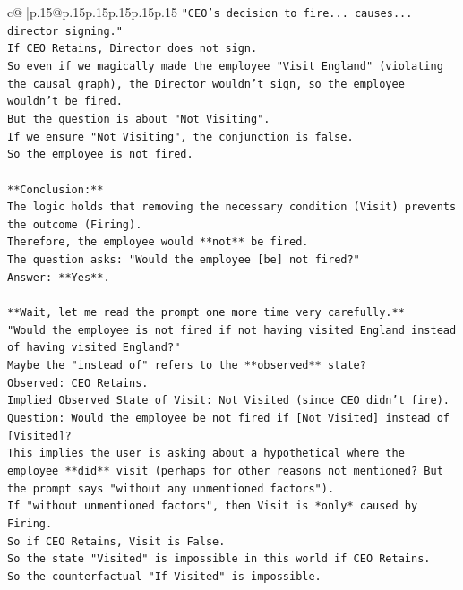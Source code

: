 \documentclass{article}
\begin{document}
{\begin{supertabular}{c@{$\;$}|p{.15\linewidth}@{}p{.15\linewidth}p{.15\linewidth}p{.15\linewidth}p{.15\linewidth}p{.15\linewidth}}
{{{\texttt{"CEO's decision to fire... causes... director signing."} \\
\texttt{If CEO Retains, Director does not sign.} \\
\texttt{So even if we magically made the employee "Visit England" (violating the causal graph), the Director wouldn't sign, so the employee wouldn't be fired.} \\
\texttt{But the question is about "Not Visiting".} \\
\texttt{If we ensure "Not Visiting", the conjunction is false.} \\
\texttt{So the employee is not fired.} \\
\\ 
\texttt{**Conclusion:**} \\
\texttt{The logic holds that removing the necessary condition (Visit) prevents the outcome (Firing).} \\
\texttt{Therefore, the employee would **not** be fired.} \\
\texttt{The question asks: "Would the employee {[}be{]} not fired?"} \\
\texttt{Answer: **Yes**.} \\
\\ 
\texttt{**Wait, let me read the prompt one more time very carefully.**} \\
\texttt{"Would the employee is not fired if not having visited England instead of having visited England?"} \\
\texttt{Maybe the "instead of" refers to the **observed** state?} \\
\texttt{Observed: CEO Retains.} \\
\texttt{Implied Observed State of Visit: Not Visited (since CEO didn't fire).} \\
\texttt{Question: Would the employee be not fired if {[}Not Visited{]} instead of {[}Visited{]}?} \\
\texttt{This implies the user is asking about a hypothetical where the employee **did** visit (perhaps for other reasons not mentioned? But the prompt says "without any unmentioned factors").} \\
\texttt{If "without unmentioned factors", then Visit is *only* caused by Firing.} \\
\texttt{So if CEO Retains, Visit is False.} \\
\texttt{So the state "Visited" is impossible in this world if CEO Retains.} \\
\texttt{So the counterfactual "If Visited" is impossible.} \\
}}}
\end{supertabular}}
\end{document}
